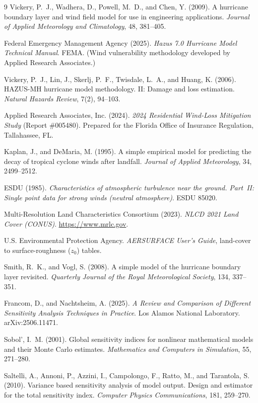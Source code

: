 \documentclass[11pt]{article}
\begin{document}
\begin{thebibliography}{9}
 Vickery, P.~J., Wadhera, D., Powell, M.~D., and Chen, Y. (2009).
A hurricane boundary layer and wind field model for use in engineering applications.
\emph{Journal of Applied Meteorology and Climatology}, 48, 381--405.

 Federal Emergency Management Agency (2025). \emph{Hazus 7.0
Hurricane Model Technical Manual}. FEMA. (Wind vulnerability methodology developed
by Applied Research Associates.)

 Vickery, P.~J., Lin, J., Skerlj, P.~F., Twisdale, L.~A.,
and Huang, K. (2006). HAZUS-MH hurricane model methodology. II: Damage and loss
estimation. \emph{Natural Hazards Review}, 7(2), 94--103.

 Applied Research Associates, Inc. (2024). \emph{2024
Residential Wind-Loss Mitigation Study} (Report \#005480). Prepared for the
Florida Office of Insurance Regulation, Tallahassee, FL.

 Kaplan, J., and DeMaria, M. (1995). A simple empirical model for
predicting the decay of tropical cyclone winds after landfall.
\emph{Journal of Applied Meteorology}, 34, 2499--2512.

 ESDU (1985). \emph{Characteristics of atmospheric turbulence near the
ground. Part~II: Single point data for strong winds (neutral atmosphere)}. ESDU 85020.

 Multi-Resolution Land Characteristics Consortium (2023).
\emph{NLCD 2021 Land Cover (CONUS)}. \url{https://www.mrlc.gov}.

 U.S. Environmental Protection Agency.
\emph{AERSURFACE User's Guide}, land-cover to surface-roughness ($z_0$) tables.

 Smith, R.~K., and Vogl, S. (2008). A simple model of the
hurricane boundary layer revisited. \emph{Quarterly Journal of the Royal
Meteorological Society}, 134, 337--351.

 Francom, D., and Nachtsheim, A. (2025). \emph{A Review and
Comparison of Different Sensitivity Analysis Techniques in Practice}. Los Alamos
National Laboratory. arXiv:2506.11471.

 Sobol', I.~M. (2001). Global sensitivity indices for nonlinear
mathematical models and their Monte Carlo estimates. \emph{Mathematics and
Computers in Simulation}, 55, 271--280.

 Saltelli, A., Annoni, P., Azzini, I., Campolongo, F.,
Ratto, M., and Tarantola, S. (2010). Variance based sensitivity analysis of model
output. Design and estimator for the total sensitivity index. \emph{Computer
Physics Communications}, 181, 259--270.


\end{thebibliography}
\end{document}
